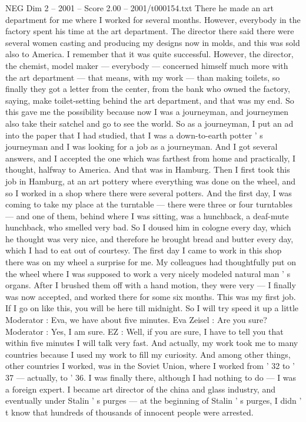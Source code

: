 \begin{textsample}{NEG Dim 2 – 2001 – Score 2.00 – 2001/t000154.txt}
There he made an art department for me where I worked for several months.
However, everybody in the factory spent his time at the art department.
The director there said there were several women casting and producing my designs now in molds, and this was sold also to America.
I remember that it was quite successful.
However, the director, the chemist, model maker — everybody — concerned himself much more with the art department — that means, with my work — than making toilets, so finally they got a letter from the center, from the bank who owned the factory, saying, make toilet-setting behind the art department, and that was my end.
So this gave me the possibility because now I was a journeyman, and journeymen also take their satchel and go to see the world.
So as a journeyman, I put an ad into the paper that I had studied, that I was a down-to-earth potter ' s journeyman and I was looking for a job as a journeyman.
And I got several answers, and I accepted the one which was farthest from home and practically, I thought, halfway to America.
And that was in Hamburg.
Then I first took this job in Hamburg, at an art pottery where everything was done on the wheel, and so I worked in a shop where there were several potters.
And the first day, I was coming to take my place at the turntable — there were three or four turntables — and one of them, behind where I was sitting, was a hunchback, a deaf-mute hunchback, who smelled very bad.
So I doused him in cologne every day, which he thought was very nice, and therefore he brought bread and butter every day, which I had to eat out of courtesy.
The first day I came to work in this shop there was on my wheel a surprise for me.
My colleagues had thoughtfully put on the wheel where I was supposed to work a very nicely modeled natural man ' s organs.
After I brushed them off with a hand motion, they were very — I finally was now accepted, and worked there for some six months.
This was my first job.
If I go on like this, you will be here till midnight.
So I will try speed it up a little Moderator : Eva, we have about five minutes.
Eva Zeisel : Are you sure?
Moderator : Yes, I am sure.
EZ : Well, if you are sure, I have to tell you that within five minutes I will talk very fast.
And actually, my work took me to many countries because I used my work to fill my curiosity.
And among other things, other countries I worked, was in the Soviet Union, where I worked from ' 32 to ' 37 — actually, to ' 36.
I was finally there, although I had nothing to do — I was a foreign expert.
I became art director of the china and glass industry, and eventually under Stalin ' s purges — at the beginning of Stalin ' s purges, I didn ' t know that hundreds of thousands of innocent people were arrested.

\end{textsample}
